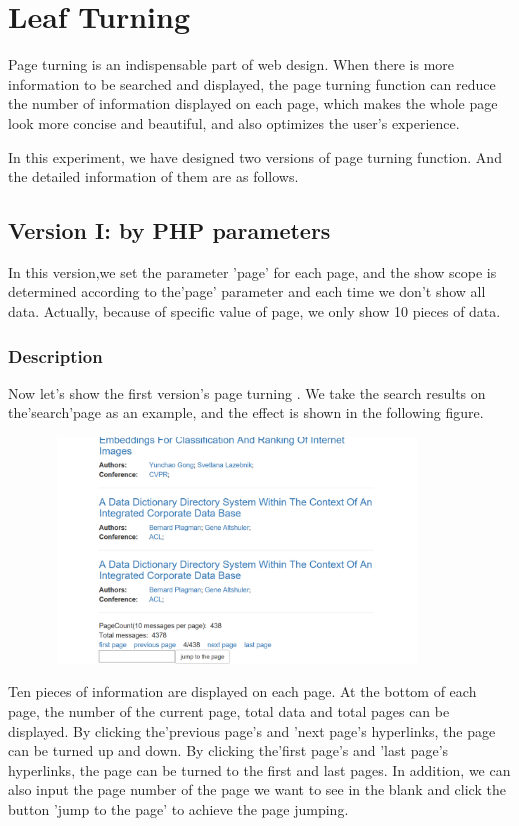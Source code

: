 \documentclass{book}
\begin{document}
\chapter{Leaf Turning}

Page turning is an indispensable part of web design. When there is more information to be searched and displayed, the page turning function can reduce the number of information displayed on each page, which makes the whole page look more concise and beautiful, and also optimizes the user's experience.

In this experiment, we have designed two versions of page turning function. And the detailed information of them are as follows.

\section{Version I: by PHP parameters}
In this version,we set the parameter 'page' for each page, and the show scope is determined according to the'page' parameter and each time we don't show all data. Actually, because of specific value of page, we only show 10 pieces of data.
\subsection{Description}
Now let's show the first version's page turning . We take the search results on the'search'page as an example, and the effect is shown in the following figure.

\begin{figure}[H]
\centering
\includegraphics[height=6.0cm,width=10.0cm]{img/dsw_11.png}

\end{figure}
Ten pieces of information are displayed on each page. At the bottom of each page, the number of the current page, total data and total pages can be displayed. By clicking the'previous page's and 'next page's hyperlinks, the page can be turned up and down. By clicking the'first page's and 'last page's hyperlinks, the page can be turned to the first and last pages. In addition, we can also input the page number of the page we want to see in the blank and click the button 'jump to the page' to achieve the page jumping.
\end{document}

